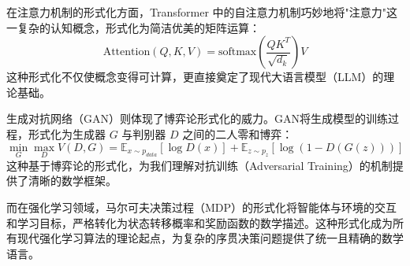
在注意力机制的形式化方面，Transformer 中的自注意力机制巧妙地将"注意力"这一复杂的认知概念，形式化为简洁优美的矩阵运算：
$$\text{Attention}(Q,K,V) = \text{softmax}(\frac{QK^T}{\sqrt{d_k}})V$$
这种形式化不仅使概念变得可计算，更直接奠定了现代大语言模型（LLM）的理论基础。

生成对抗网络（GAN）则体现了博弈论形式化的威力。GAN将生成模型的训练过程，形式化为生成器 $G$ 与判别器 $D$ 之间的二人零和博弈：
$$\min_G \max_D V(D,G) = \mathbb{E}_{x \sim p_{data}}[\log D(x)] + \mathbb{E}_{z \sim p_z}[\log(1-D(G(z)))]$$
这种基于博弈论的形式化，为我们理解对抗训练（Adversarial Training）的机制提供了清晰的数学框架。

而在强化学习领域，马尔可夫决策过程（MDP）的形式化将智能体与环境的交互和学习目标，严格转化为状态转移概率和奖励函数的数学描述。这种形式化成为所有现代强化学习算法的理论起点，为复杂的序贯决策问题提供了统一且精确的数学语言。

